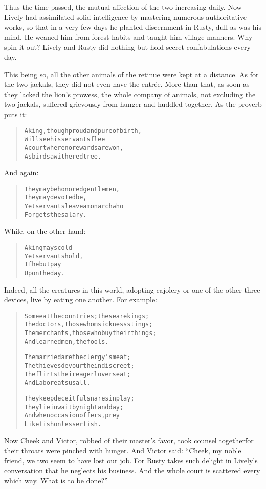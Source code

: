 \documentclass[article, twoside, 14pt]{memoir}
\renewenvironment{verbatim}{%
\begin{quote}%
\vskip -10pt%
\begin{alltt}\normalfont\large}{\end{alltt}%
\end{quote}%
\vskip -10pt
} %
\begin{document}
Thus the time passed, the mutual affection of the two increasing
daily. Now Lively had assimilated solid intelligence by mastering
numerous authoritative works, so that in a very few days he planted
discernment in Rusty, dull as was his mind. He weaned him from
forest habits and taught him village manners. Why spin it out?
Lively and Rusty did nothing but hold secret confabulations every
day.

This being so, all the other animals of the retinue were kept at a
distance. As for the two jackals, they did not even have the
entrée. More than that, as soon as they lacked the lion's
prowess, the whole company of animals, not excluding the two
jackals, suffered grievously from hunger and huddled together. As
the proverb puts it:

\begin{verbatim}
A king, though proud and pure of birth,
    Will see his servants flee
A court where no rewards are won,
    As birds a withered tree.
\end{verbatim}
And again:

\begin{verbatim}
They may be honored gentlemen,
    They may devoted be,
Yet servants leave a monarch who
    Forgets the salary.
\end{verbatim}
While, on the other hand:

\begin{verbatim}
A king may scold
Yet servants hold,
If he but pay
Upon the day.
\end{verbatim}
Indeed, all the creatures in this world, adopting cajolery or one
of the other three devices, live by eating one another. For
example:

\begin{verbatim}
Some eat the countries; these are kings;
The doctors, those whom sickness stings;
The merchants, those who buy their things;
And learned men, the fools.

The married are the clergy's meat;
The thieves devour the indiscreet;
The flirts their eager lovers eat;
And Labor eats us all.

They keep deceitful snares in play;
They lie in wait by night and day;
And when occasion offers, prey
Like fish on lesser fish.
\end{verbatim}
Now Cheek and Victor, robbed of their master's favor, took counsel
together{\textemdash}for their throats were pinched with hunger. And Victor
said:
``Cheek, my noble friend, we two seem to have lost our job. For Rusty takes such delight in Lively's conversation that he neglects his business. And the whole court is scattered every which way. What is to be done?''
\end{document}
